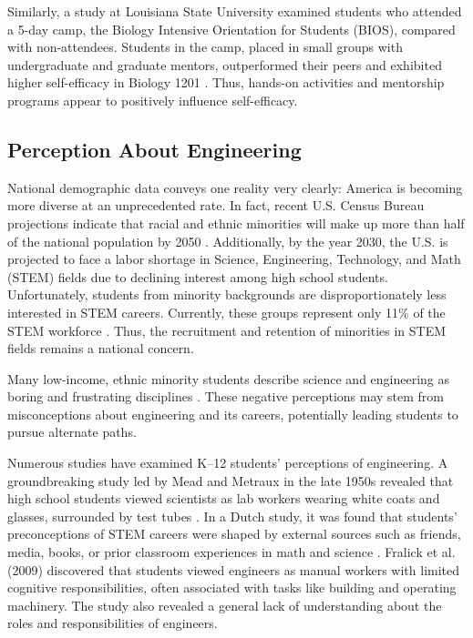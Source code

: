 \documentclass[11pt]{article}
\begin{document}
Similarly, a study at Louisiana State University examined students who attended a 5-day camp, the Biology Intensive Orientation for Students (BIOS), compared with non-attendees. Students in the camp, placed in small groups with undergraduate and graduate mentors, outperformed their peers and exhibited higher self-efficacy in Biology 1201 \cite{wheeler2014}. Thus, hands-on activities and mentorship programs appear to positively influence self-efficacy.

\subsection{Perception About Engineering}

National demographic data conveys one reality very clearly: America is becoming more diverse at an unprecedented rate. In fact, recent U.S. Census Bureau projections indicate that racial and ethnic minorities will make up more than half of the national population by 2050 \cite{zarske2012}. Additionally, by the year 2030, the U.S. is projected to face a labor shortage in Science, Engineering, Technology, and Math (STEM) fields due to declining interest among high school students. Unfortunately, students from minority backgrounds are disproportionately less interested in STEM careers. Currently, these groups represent only 11\% of the STEM workforce \cite{chubin2005}. Thus, the recruitment and retention of minorities in STEM fields remains a national concern.

Many low-income, ethnic minority students describe science and engineering as boring and frustrating disciplines \cite{mark2013}. These negative perceptions may stem from misconceptions about engineering and its careers, potentially leading students to pursue alternate paths. 

Numerous studies have examined K--12 students' perceptions of engineering. A groundbreaking study led by Mead and Metraux in the late 1950s revealed that high school students viewed scientists as lab workers wearing white coats and glasses, surrounded by test tubes \cite{fralick2009}. In a Dutch study, it was found that students’ preconceptions of STEM careers were shaped by external sources such as friends, media, books, or prior classroom experiences in math and science \cite{korpershoek2013}. Fralick et al. (2009) discovered that students viewed engineers as manual workers with limited cognitive responsibilities, often associated with tasks like building and operating machinery. The study also revealed a general lack of understanding about the roles and responsibilities of engineers.
\end{document}
